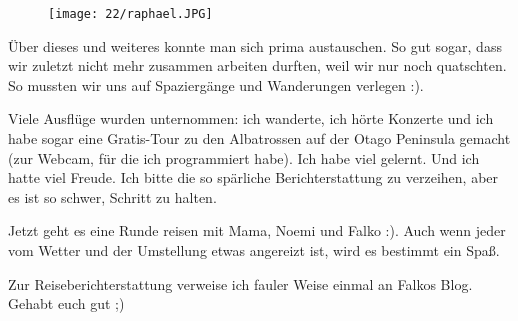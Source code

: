 \begin{figure}[h]
  \centering
  \texttt{[image: 22/raphael.JPG]}
\end{figure}
Über dieses und weiteres konnte man sich prima austauschen. So gut
sogar, dass wir zuletzt nicht mehr zusammen arbeiten durften, weil wir
nur noch quatschten. So mussten wir uns auf Spaziergänge und
Wanderungen verlegen :).

Viele Ausflüge wurden unternommen: ich wanderte, ich hörte Konzerte und
ich habe sogar eine Gratis-Tour zu den Albatrossen auf der Otago
Peninsula gemacht (zur Webcam, für die ich programmiert habe). Ich habe
viel gelernt. Und ich hatte viel Freude. Ich bitte die so spärliche
Berichterstattung zu verzeihen, aber es ist so schwer, Schritt zu
halten.

Jetzt geht es eine Runde reisen mit Mama, Noemi und Falko :). Auch wenn
jeder vom Wetter und der Umstellung etwas angereizt ist, wird es
bestimmt ein Spaß.

Zur Reiseberichterstattung verweise ich fauler Weise einmal an Falkos
Blog. Gehabt euch gut ;)
